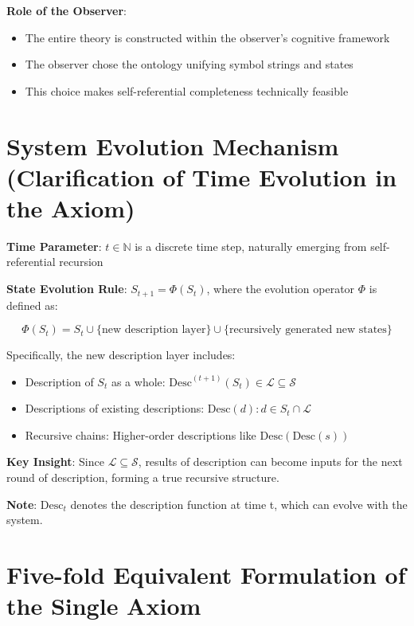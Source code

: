 \textbf{Role of the Observer}:
\begin{itemize}
\item The entire theory is constructed within the observer's cognitive framework
\item The observer chose the ontology unifying symbol strings and states
\item This choice makes self-referential completeness technically feasible
\end{itemize}

\section{System Evolution Mechanism (Clarification of Time Evolution in the Axiom)}
\label{sec:ch01_axiom_and_derivation:system-evolution-mechanism-clarification-of-time-evolution-in-the-axiom}

\textbf{Time Parameter}: $t \in \mathbb{N}$ is a discrete time step, naturally emerging from self-referential recursion

\textbf{State Evolution Rule}: $S_{t+1} = \Phi(S_t)$, where the evolution operator $\Phi$ is defined as:

\begin{equation}
\Phi(S_t) = S_t \cup \{\text{new description layer}\} \cup \{\text{recursively generated new states}\}
\end{equation}

Specifically, the new description layer includes:
\begin{itemize}
\item Description of $S_t$ as a whole: $\text{Desc}^{(t+1)}(S_t) \in \mathcal{L} \subseteq \mathcal{S}$
\item Descriptions of existing descriptions: ${\text{Desc}(d) : d \in S_t \cap \mathcal{L}}$
\item Recursive chains: Higher-order descriptions like $\text{Desc}(\text{Desc}(s))$
\end{itemize}

\textbf{Key Insight}: Since $\mathcal{L} \subseteq \mathcal{S}$, results of description can become inputs for the next round of description, forming a true recursive structure.

\textbf{Note}: $\text{Desc}_t$ denotes the description function at time t, which can evolve with the system.

\section{Five-fold Equivalent Formulation of the Single Axiom}
\label{sec:ch01_axiom_and_derivation:five-fold-equivalent-formulation-of-the-single-axiom}

